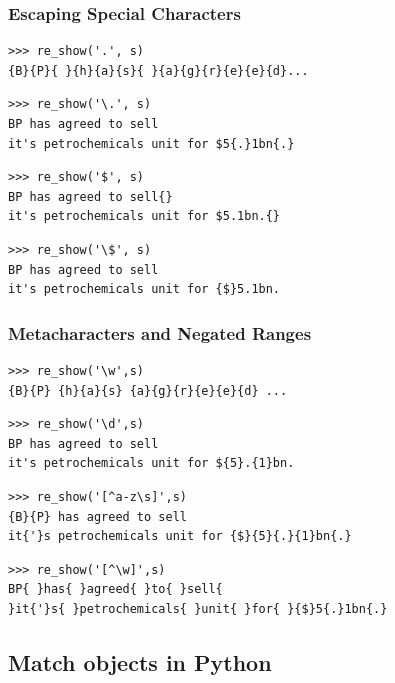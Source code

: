 \begin{frame}[fragile]
\frametitle{Escaping Special Characters}


\begin{verbatim}
>>> re_show('.', s)
{B}{P}{ }{h}{a}{s}{ }{a}{g}{r}{e}{e}{d}...
\end{verbatim}

\begin{verbatim}
>>> re_show('\.', s)
BP has agreed to sell
it's petrochemicals unit for $5{.}1bn{.}
\end{verbatim}

\begin{verbatim}
>>> re_show('$', s)
BP has agreed to sell{}
it's petrochemicals unit for $5.1bn.{}
\end{verbatim}

\begin{verbatim}
>>> re_show('\$', s)
BP has agreed to sell
it's petrochemicals unit for {$}5.1bn.
\end{verbatim}
\end{frame}

\begin{frame}[fragile]
\frametitle{Metacharacters and Negated Ranges}


\begin{verbatim}
>>> re_show('\w',s)
{B}{P} {h}{a}{s} {a}{g}{r}{e}{e}{d} ...
\end{verbatim}

\begin{verbatim}
>>> re_show('\d',s)
BP has agreed to sell
it's petrochemicals unit for ${5}.{1}bn.
\end{verbatim}

\begin{verbatim}
>>> re_show('[^a-z\s]',s)
{B}{P} has agreed to sell
it{'}s petrochemicals unit for {$}{5}{.}{1}bn{.}
\end{verbatim}

\begin{verbatim}
>>> re_show('[^\w]',s)
BP{ }has{ }agreed{ }to{ }sell{
}it{'}s{ }petrochemicals{ }unit{ }for{ }{$}5{.}1bn{.}
\end{verbatim}
\end{frame}

\subsection{Match objects in Python}

